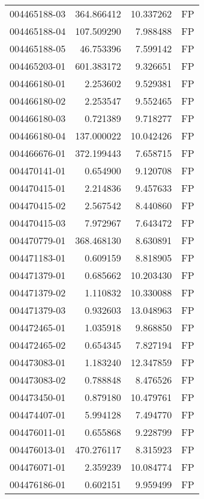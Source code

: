 \begin{tabular}{lrrl}
004465188-03 &  364.866412 &      10.337262 &   FP \\
004465188-04 &  107.509290 &       7.988488 &   FP \\
004465188-05 &   46.753396 &       7.599142 &   FP \\
004465203-01 &  601.383172 &       9.326651 &   FP \\
004466180-01 &    2.253602 &       9.529381 &   FP \\
004466180-02 &    2.253547 &       9.552465 &   FP \\
004466180-03 &    0.721389 &       9.718277 &   FP \\
004466180-04 &  137.000022 &      10.042426 &   FP \\
004466676-01 &  372.199443 &       7.658715 &   FP \\
004470141-01 &    0.654900 &       9.120708 &   FP \\
004470415-01 &    2.214836 &       9.457633 &   FP \\
004470415-02 &    2.567542 &       8.440860 &   FP \\
004470415-03 &    7.972967 &       7.643472 &   FP \\
004470779-01 &  368.468130 &       8.630891 &   FP \\
004471183-01 &    0.609159 &       8.818905 &   FP \\
004471379-01 &    0.685662 &      10.203430 &   FP \\
004471379-02 &    1.110832 &      10.330088 &   FP \\
004471379-03 &    0.932603 &      13.048963 &   FP \\
004472465-01 &    1.035918 &       9.868850 &   FP \\
004472465-02 &    0.654345 &       7.827194 &   FP \\
004473083-01 &    1.183240 &      12.347859 &   FP \\
004473083-02 &    0.788848 &       8.476526 &   FP \\
004473450-01 &    0.879180 &      10.479761 &   FP \\
004474407-01 &    5.994128 &       7.494770 &   FP \\
004476011-01 &    0.655868 &       9.228799 &   FP \\
004476013-01 &  470.276117 &       8.315923 &   FP \\
004476071-01 &    2.359239 &      10.084774 &   FP \\
004476186-01 &    0.602151 &       9.959499 &   FP \\

\end{tabular}
